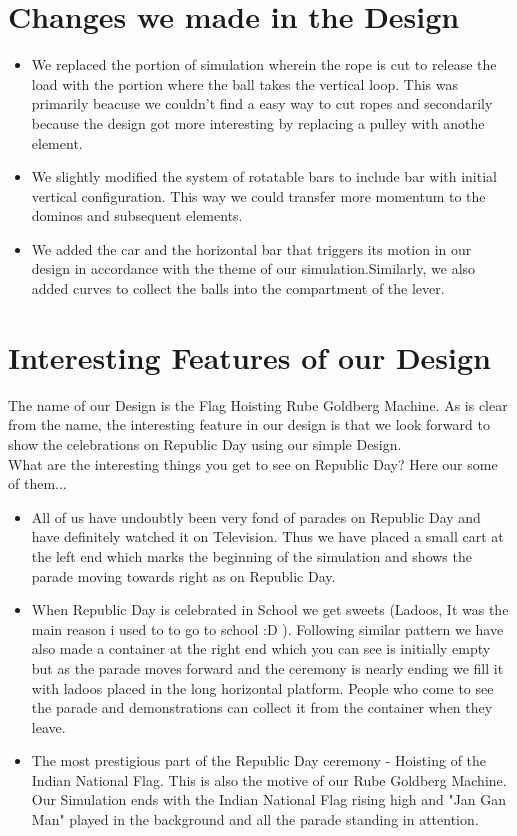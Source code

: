 \documentclass[11pt, a4paper]{article}
\begin{document}
\begin{itemize}
\end{itemize}

\section {Changes we made in the Design}

\begin{itemize}
\item We replaced the portion of simulation wherein the rope is cut to release the load with the portion where the ball takes the vertical loop. This was primarily beacuse we couldn't find a easy way to cut ropes and secondarily because the design got more interesting by replacing a pulley with anothe element.
\item We slightly modified the system of rotatable bars to include bar with initial vertical configuration. This way we could transfer more momentum to the dominos and subsequent elements.
\item We added the car and the horizontal bar that triggers its motion in our design in accordance with the theme of our simulation.Similarly, we also added curves to collect the balls into the compartment of the lever. 


\end{itemize}

\section {Interesting Features of our Design}

The name of our Design is the Flag Hoisting Rube Goldberg Machine. As is clear from the name, the interesting feature in our design is that we look forward to show the celebrations on Republic Day using our simple Design. \\
What are the interesting things you get to see on Republic Day? Here our some of them... \\
\begin{itemize}
\item All of us have undoubtly been very fond of parades on Republic Day and have definitely watched it on Television. Thus we have placed a small cart at the left end which marks the beginning of the simulation and shows the parade moving towards right as on Republic Day.
\item When Republic Day is celebrated in School we get sweets (Ladoos, It was the main reason i used to to go to school :D ). Following similar pattern we have also made a container at the right end which you can see is initially empty but as the parade moves forward and the ceremony is nearly ending we fill it with ladoos placed in the long horizontal platform. People who come to see the parade and demonstrations can collect it from the container when they leave.
\item The most prestigious part of the Republic Day ceremony - Hoisting of the Indian National Flag. This is also the motive of our Rube Goldberg Machine. Our Simulation ends with the Indian National Flag rising high and "Jan Gan Man" played in the background and all the parade standing in attention.
  
\end{itemize}
       
\end{document}
